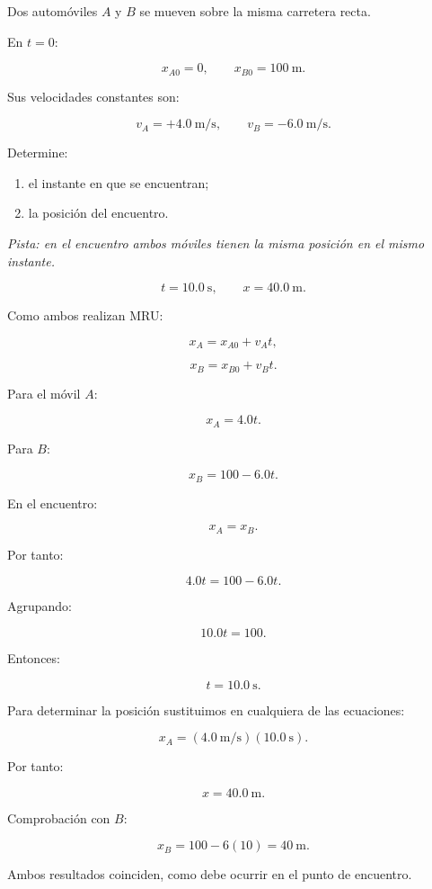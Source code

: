 \begin{ejercicio}
Dos automóviles \(A\) y \(B\) se mueven sobre la misma carretera recta.

En \(t=0\):

\[
x_{A0}=0,
\qquad
x_{B0}=\SI{100}{\meter}.
\]

Sus velocidades constantes son:

\[
v_A=+\SI{4.0}{\meter\per\second},
\qquad
v_B=-\SI{6.0}{\meter\per\second}.
\]

Determine:

\begin{enumerate}[label=\alph*)]
    \item el instante en que se encuentran;
    \item la posición del encuentro.
\end{enumerate}

\textit{Pista: en el encuentro ambos móviles tienen la misma posición en el mismo instante.}
\end{ejercicio}

\begin{respuesta}
\[
\boxed{t=\SI{10.0}{\second}},
\qquad
\boxed{x=\SI{40.0}{\meter}}.
\]
\end{respuesta}

\begin{explicacion}
Como ambos realizan MRU:

\[
x_A=x_{A0}+v_At,
\]

\[
x_B=x_{B0}+v_Bt.
\]

Para el móvil \(A\):

\[ x_A=4.0t. \]

Para \(B\):

\[ x_B=100-6.0t. \]

En el encuentro:

\[ x_A=x_B. \]

Por tanto:

\[
4.0t=100-6.0t.
\]

Agrupando:

\[ 10.0t=100. \]

Entonces:

\[ \boxed{t=\SI{10.0}{\second}}. \]

Para determinar la posición sustituimos en cualquiera de las ecuaciones:

\[
x_A
=
(\SI{4.0}{\meter\per\second})
(\SI{10.0}{\second}).
\]

Por tanto:

\[ \boxed{x=\SI{40.0}{\meter}}. \]

Comprobación con \(B\):

\[
x_B
=
100-6(10)
=
\SI{40}{\meter}.
\]

Ambos resultados coinciden, como debe ocurrir en el punto de encuentro.
\end{explicacion}


